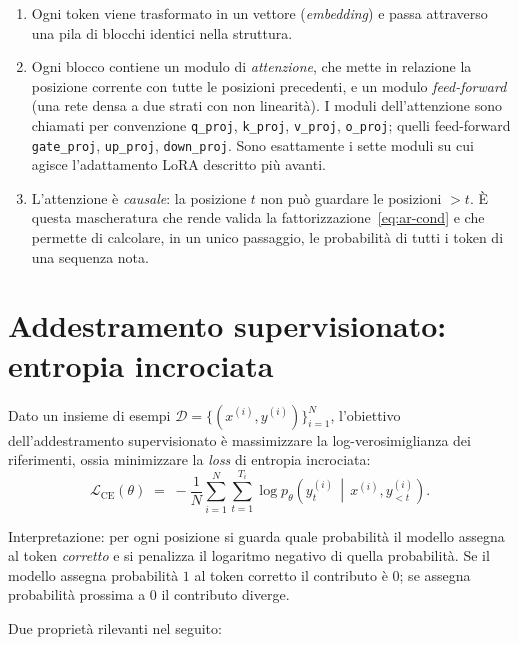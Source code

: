 \begin{enumerate}
  \item Ogni token viene trasformato in un vettore (\emph{embedding}) e passa
        attraverso una pila di blocchi identici nella struttura.
  \item Ogni blocco contiene un modulo di \emph{attenzione}, che mette in
        relazione la posizione corrente con tutte le posizioni precedenti, e un
        modulo \emph{feed-forward} (una rete densa a due strati con non
        linearità). I moduli dell'attenzione sono chiamati per convenzione
        \texttt{q\_proj}, \texttt{k\_proj}, \texttt{v\_proj}, \texttt{o\_proj};
        quelli feed-forward \texttt{gate\_proj}, \texttt{up\_proj},
        \texttt{down\_proj}. Sono esattamente i sette moduli su cui agisce
        l'adattamento LoRA descritto più avanti.
  \item L'attenzione è \emph{causale}: la posizione $t$ non può guardare le
        posizioni $> t$. È questa mascheratura che rende valida la
        fattorizzazione~\eqref{eq:ar-cond} e che permette di calcolare, in un
        unico passaggio, le probabilità di tutti i token di una sequenza nota.
\end{enumerate}

\section{Addestramento supervisionato: entropia incrociata}

Dato un insieme di esempi $\mathcal{D} = \{(x^{(i)}, y^{(i)})\}_{i=1}^N$,
l'obiettivo dell'addestramento supervisionato è massimizzare la
log-verosimiglianza dei riferimenti, ossia minimizzare la \emph{loss} di
entropia incrociata:
\begin{equation}
  \label{eq:ce}
  \mathcal{L}_{\text{CE}}(\theta)
  \;=\;
  -\frac{1}{N}\sum_{i=1}^{N} \sum_{t=1}^{T_i}
  \log p_\theta\!\left(y^{(i)}_t \,\middle|\, x^{(i)}, y^{(i)}_{<t}\right).
\end{equation}

Interpretazione: per ogni posizione si guarda quale probabilità il modello
assegna al token \emph{corretto} e si penalizza il logaritmo negativo di quella
probabilità. Se il modello assegna probabilità $1$ al token corretto il
contributo è $0$; se assegna probabilità prossima a $0$ il contributo diverge.

Due proprietà rilevanti nel seguito:

